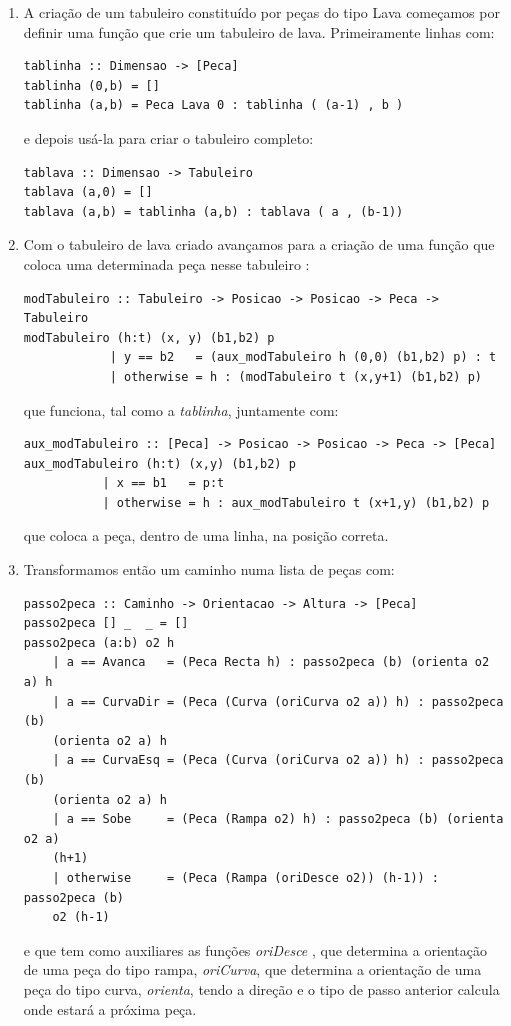 \documentclass[a4paper]{report} %
\begin{document}
\begin{enumerate}

\item A criação de um tabuleiro constituído por peças do tipo Lava começamos por definir uma função que crie um tabuleiro de lava. Primeiramente linhas com:

\begin{verbatim}
tablinha :: Dimensao -> [Peca]
tablinha (0,b) = []
tablinha (a,b) = Peca Lava 0 : tablinha ( (a-1) , b ) 
\end{verbatim}
e depois usá-la para criar o tabuleiro completo: 

\begin{verbatim}
tablava :: Dimensao -> Tabuleiro
tablava (a,0) = [] 
tablava (a,b) = tablinha (a,b) : tablava ( a , (b-1)) 
\end{verbatim}

\item Com o tabuleiro de lava criado avançamos para a criação de uma função que coloca uma determinada peça nesse tabuleiro :

\begin{verbatim}
modTabuleiro :: Tabuleiro -> Posicao -> Posicao -> Peca -> Tabuleiro
modTabuleiro (h:t) (x, y) (b1,b2) p
            | y == b2   = (aux_modTabuleiro h (0,0) (b1,b2) p) : t
            | otherwise = h : (modTabuleiro t (x,y+1) (b1,b2) p)
\end{verbatim}
que funciona, tal como a \emph{tablinha}, juntamente com:

\begin{verbatim}
aux_modTabuleiro :: [Peca] -> Posicao -> Posicao -> Peca -> [Peca]
aux_modTabuleiro (h:t) (x,y) (b1,b2) p 
           | x == b1   = p:t
           | otherwise = h : aux_modTabuleiro t (x+1,y) (b1,b2) p
\end{verbatim}
que coloca a peça, dentro de uma linha, na posição correta.

\item Transformamos então um caminho numa lista de peças com:
\small{
\begin{verbatim}
passo2peca :: Caminho -> Orientacao -> Altura -> [Peca]
passo2peca [] _  _ = []
passo2peca (a:b) o2 h 
    | a == Avanca   = (Peca Recta h) : passo2peca (b) (orienta o2 a) h
    | a == CurvaDir = (Peca (Curva (oriCurva o2 a)) h) : passo2peca (b) 
    (orienta o2 a) h
    | a == CurvaEsq = (Peca (Curva (oriCurva o2 a)) h) : passo2peca (b) 
    (orienta o2 a) h
    | a == Sobe     = (Peca (Rampa o2) h) : passo2peca (b) (orienta o2 a)
    (h+1)
    | otherwise     = (Peca (Rampa (oriDesce o2)) (h-1)) : passo2peca (b) 
    o2 (h-1)
\end{verbatim}
}
e que tem como auxiliares as funções {\color{blue}\emph{oriDesce}}
, que determina a orientação de uma peça do tipo rampa, {\color{blue}\emph{oriCurva}}, que determina a orientação de uma peça do tipo curva, {\color{blue}\emph{orienta}}, tendo a direção e o tipo de passo anterior calcula onde estará a próxima peça.


\end{enumerate}
\end{document}
